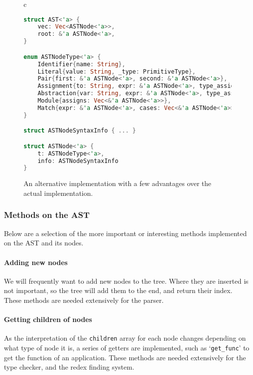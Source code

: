 \begin{figure}[t]
    \centering
    \begin{tabular}{c}
    \begin{lstlisting}[language=Rust]
struct AST<'a> {
    vec: Vec<ASTNode<'a>>,
    root: &'a ASTNode<'a>,
}

enum ASTNodeType<'a> {
    Identifier{name: String},
    Literal{value: String, _type: PrimitiveType},
    Pair{first: &'a ASTNode<'a>, second: &'a ASTNode<'a>},
    Assignment{to: String, expr: &'a ASTNode<'a>, type_assign: Type},
    Abstraction{var: String, expr: &'a ASTNode<'a>, type_assign: Type},
    Module{assigns: Vec<&'a ASTNode<'a>>},
    Match{expr: &'a ASTNode<'a>, cases: Vec<&'a ASTNode<'a>>}
} 

struct ASTNodeSyntaxInfo { ... }

struct ASTNode<'a> {
    t: ASTNodeType<'a>,
    info: ASTNodeSyntaxInfo
}
    \end{lstlisting}
    \end{tabular}
    \caption{An alternative implementation with a few advantages over the actual implementation. }
    \label{fig:ast_lst_2}
\end{figure}

\subsubsection{Methods on the AST}
Below are a selection of the more important or interesting methods implemented on the AST and its nodes.

\paragraph{Adding new nodes} We will frequently want to add new nodes to the tree. Where they are inserted is not important, so the tree will add them to the end, and return their index. These methods are needed extensively for the parser.

\paragraph{Getting children of nodes} As the interpretation of the \verb|children| array for each node changes depending on what type of node it is, a series of getters are implemented, such as `\verb|get_func|' to get the function of an application. These methods are needed extensively for the type checker, and the redex finding system. 

